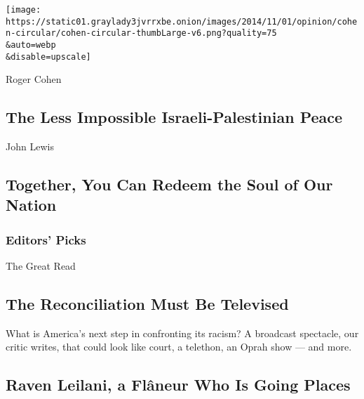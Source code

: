 \texttt{[image: https://static01.graylady3jvrrxbe.onion/images/2014/11/01/opinion/cohen-circular/cohen-circular-thumbLarge-v6.png?quality=75\\\&auto=webp\\\&disable=upscale]}

Roger Cohen

\hypertarget{the-less-impossible-israeli-palestinian-peace}{%
\subsection{The Less Impossible Israeli-Palestinian
Peace}\label{the-less-impossible-israeli-palestinian-peace}}

\href{/2020/07/30/opinion/john-lewis-civil-rights-america.html}{}

John Lewis

\hypertarget{together-you-can-redeem-the-soul-of-our-nation}{%
\subsection{Together, You Can Redeem the Soul of Our
Nation}\label{together-you-can-redeem-the-soul-of-our-nation}}

\hypertarget{editors-picks}{%
\subsubsection{Editors' Picks}\label{editors-picks}}

\href{/2020/07/30/arts/television/the-moment-racism-tv.html}{}

The Great Read

\hypertarget{the-reconciliation-must-be-televised}{%
\subsection{The Reconciliation Must Be
Televised}\label{the-reconciliation-must-be-televised}}

\href{/2020/07/30/arts/television/the-moment-racism-tv.html}{}

What is America's next step in confronting its racism? A broadcast
spectacle, our critic writes, that could look like court, a telethon, an
Oprah show --- and more.

\href{/2020/07/30/arts/television/the-moment-racism-tv.html}{}

\href{/2020/07/31/books/raven-leilani-luster.html}{}

\hypertarget{raven-leilani-a-fluxe2neur-who-is-going-places}{%
\subsection{Raven Leilani, a Flâneur Who Is Going
Places}\label{raven-leilani-a-fluxe2neur-who-is-going-places}}

